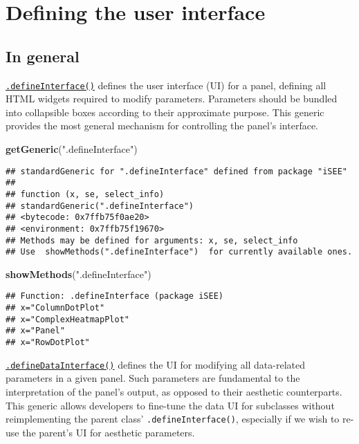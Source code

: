 \documentclass[
]{book}
\newenvironment{Shaded}{\begin{snugshade}}{\end{snugshade}}
\newcommand{\KeywordTok}[1]{\textcolor[rgb]{0.13,0.29,0.53}{\textbf{#1}}}
\newcommand{\NormalTok}[1]{#1}
\newcommand{\StringTok}[1]{\textcolor[rgb]{0.31,0.60,0.02}{#1}}
\begin{document}
\hypertarget{defining-the-user-interface}{%
\section{Defining the user interface}\label{defining-the-user-interface}}

\hypertarget{in-general}{%
\subsection{In general}\label{in-general}}

\href{https://isee.github.io/iSEE/reference/interface-generics.html}{\texttt{.defineInterface()}} defines the user interface (UI) for a panel, defining all HTML widgets required to modify parameters.
Parameters should be bundled into collapsible boxes according to their approximate purpose.
This generic provides the most general mechanism for controlling the panel's interface.

\begin{Shaded}
\begin{Highlighting}[]
\KeywordTok{getGeneric}\NormalTok{(}\StringTok{".defineInterface"}\NormalTok{)}
\end{Highlighting}
\end{Shaded}

\begin{verbatim}
## standardGeneric for ".defineInterface" defined from package "iSEE"
## 
## function (x, se, select_info) 
## standardGeneric(".defineInterface")
## <bytecode: 0x7ffb75f0ae20>
## <environment: 0x7ffb75f19670>
## Methods may be defined for arguments: x, se, select_info
## Use  showMethods(".defineInterface")  for currently available ones.
\end{verbatim}

\begin{Shaded}
\begin{Highlighting}[]
\KeywordTok{showMethods}\NormalTok{(}\StringTok{".defineInterface"}\NormalTok{)}
\end{Highlighting}
\end{Shaded}

\begin{verbatim}
## Function: .defineInterface (package iSEE)
## x="ColumnDotPlot"
## x="ComplexHeatmapPlot"
## x="Panel"
## x="RowDotPlot"
\end{verbatim}

\href{https://isee.github.io/iSEE/reference/interface-generics.html}{\texttt{.defineDataInterface()}} defines the UI for modifying all data-related parameters in a given panel.
Such parameters are fundamental to the interpretation of the panel's output, as opposed to their aesthetic counterparts.
This generic allows developers to fine-tune the data UI for subclasses without reimplementing the parent class' \texttt{.defineInterface()}, especially if we wish to re-use the parent's UI for aesthetic parameters.
\end{document}
